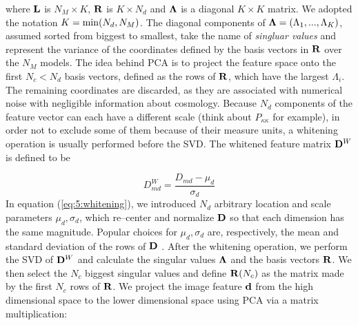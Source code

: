%
where $\mathbf{L}$ is $N_M\times K$, $\mathbf{R}$ is $K\times N_d$ and $\mathbf{\Lambda}$ is a diagonal $K\times K$ matrix. We adopted the notation $K={\rm min}(N_d,N_M)$. The diagonal components of $\mathbf{\Lambda}=(\Lambda_1,...,\Lambda_K)$, assumed sorted from biggest to smallest, take the name of \textit{singluar values} and represent the variance of the coordinates defined by the basis vectors in $\mathbf{R}$ over the $N_M$ models. The idea behind PCA is to project the feature space onto the first $N_c<N_d$ basis vectors, defined as the rows of $\mathbf{R}$, which have the largest $\Lambda_i$. The remaining coordinates are discarded, as they are associated with numerical noise with negligible information about cosmology. Because $N_d$ components of the feature vector can each have a different scale (think about $P_{\kappa\kappa}$ for example), in order not to exclude some of them because of their measure units, a whitening operation is usually performed before the SVD. The whitened feature matrix $\mathbf{D}^W$ is defined to be

\begin{equation}
\label{eq:5:whitening}
D^W_{md} = \frac{D_{md}-\mu_d}{\sigma_d}
\end{equation}
%
In equation (\ref{eq:5:whitening}), we introduced $N_d$ arbitrary location and scale parameters $\mu_d,\sigma_d$, which re--center and normalize $\mathbf{D}$ so that each dimension has the same magnitude. Popular choices for $\mu_d,\sigma_d$ are, respectively, the mean and standard deviation of the rows of $\mathbf{D}$ \citep{astroMLText}. After the whitening operation, we perform the SVD of $\mathbf{D}^W$ and calculate the singular values $\mathbf{\Lambda}$ and the basis vectors $\mathbf{R}$. We then select the $N_c$ biggest singular values and define $\mathbf{R}(N_c)$ as the matrix made by the first $N_c$ rows of $\mathbf{R}$. We project the image feature $\mathbf{d}$ from the high dimensional space to the lower dimensional space using PCA via a matrix multiplication: 

